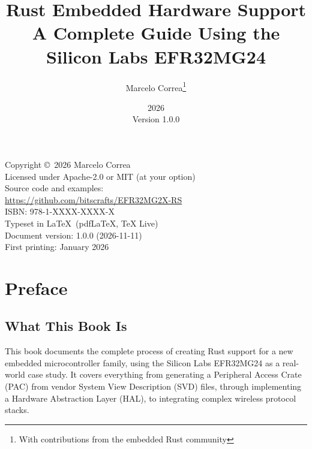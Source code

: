 \documentclass[11pt,a4paper,twoside,openright]{book}
\title{\textbf{Rust Embedded Hardware Support}\\\Large A Complete Guide Using the Silicon Labs EFR32MG24}
\author{Marcelo Correa\thanks{With contributions from the embedded Rust community}}
\date{2026\\Version 1.0.0}
\begin{document}
\frontmatter

\maketitle

\thispagestyle{empty}
\begin{center}
    \vspace*{\fill}
    Copyright \copyright\ 2026 Marcelo Correa\\
    Licensed under Apache-2.0 or MIT (at your option)\\
    \vspace{0.6em}
    Source code and examples:\\
    \url{https://github.com/bitscrafts/EFR32MG2X-RS}\\
    \vspace{0.6em}
    ISBN: 978-1-XXXX-XXXX-X\\
    \vspace{0.6em}
    Typeset in \LaTeX\ (pdfLaTeX, TeX Live)\\
    Document version: 1.0.0 (2026-11-11)\\
    First printing: January 2026
    \vspace*{\fill}
\end{center}
\clearpage

\tableofcontents
\clearpage

\listoffigures
\clearpage

\lstlistoflistings
{}
\clearpage

\chapter*{Preface}

\section*{What This Book Is}

This book documents the complete process of creating Rust support for a new embedded microcontroller family, using the Silicon Labs EFR32MG24 as a real-world case study. It covers everything from generating a Peripheral Access Crate (PAC) from vendor System View Description (SVD) files, through implementing a Hardware Abstraction Layer (HAL), to integrating complex wireless protocol stacks.
\end{document}
